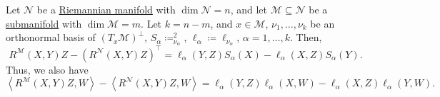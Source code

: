 \begin{theorem}\label{thm:Gauss-equations}
	Let \(\mathcal{N} \) be a \hyperref[def:Riemannian-manifold]{Riemannian manifold} with \(\dim \mathcal{N} = n\), and let \(\mathcal{M} \subseteq \mathcal{N} \) be a \hyperref[def:submanifold]{submanifold} with \(\dim \mathcal{M} = m\). Let \(k = n - m\), and \(x\in \mathcal{M} \), \(\nu _1, \ldots , \nu _k\) be an orthonormal basis of \((T_x \mathcal{M} )^{\perp} \), \(S_\alpha \coloneq^{2} _{\nu _\alpha }\), \(\ell _\alpha \coloneqq \ell _{\nu _\alpha }\), \(\alpha = 1, \ldots , k\). Then,
	\[
		R^{\mathcal{M}}(X, Y)Z - \left( R^{\mathcal{N} } (X, Y)Z \right) ^{\top}
		= \ell _\alpha (Y, Z)S_\alpha (X) - \ell _\alpha (X, Z)S_{\alpha }(Y).
	\]
	Thus, we also have
	\[
		\left\langle R^{\mathcal{M} }(X, Y)Z, W  \right\rangle - \left\langle R^{\mathcal{N} }(X, Y)Z, W \right\rangle
		= \ell _\alpha (Y, Z) \ell _\alpha (X, W) - \ell _\alpha (X, Z) \ell _\alpha (Y, W).
	\]
\end{theorem}
